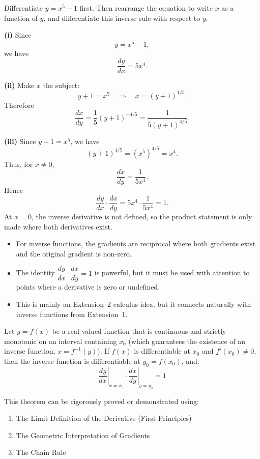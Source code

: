 \begin{hint}
Differentiate $y=x^5-1$ first. Then rearrange the equation to write $x$ as a function of $y$, and differentiate this inverse rule with respect to $y$.
\end{hint}

\begin{solution}
\textbf{(i)} Since
\[
y=x^5-1,
\]
we have
\[
\frac{dy}{dx}=5x^4.
\]

\textbf{(ii)} Make $x$ the subject:
\[
y+1=x^5
\quad\Longrightarrow\quad
x=(y+1)^{1/5}.
\]
Therefore
\[
\frac{dx}{dy}=\frac15(y+1)^{-4/5}
=\frac{1}{5(y+1)^{4/5}}.
\]

\textbf{(iii)} Since $y+1=x^5$, we have
\[
(y+1)^{4/5}=(x^5)^{4/5}=x^4.
\]
Thus, for $x\ne 0$,
\[
\frac{dx}{dy}=\frac{1}{5x^4}.
\]
Hence
\[
\frac{dy}{dx}\cdot \frac{dx}{dy}
=5x^4\cdot \frac{1}{5x^4}
=\boxed{1}.
\]
At $x=0$, the inverse derivative is not defined, so the product statement is only made where both derivatives exist.
\end{solution}

\begin{takeaways}
\begin{itemize}[leftmargin=*]
\item For inverse functions, the gradients are reciprocal where both gradients exist and the original gradient is non-zero.
\item The identity $\dfrac{dy}{dx}\cdot\dfrac{dx}{dy}=1$ is powerful, but it must be used with attention to points where a derivative is zero or undefined.
\item This is mainly an Extension~2 calculus idea, but it connects naturally with inverse functions from Extension~1.
\end{itemize}
\end{takeaways}

\begin{remark}
Let $y = f(x)$ be a real-valued function that is continuous and strictly monotonic on an interval containing $x_0$ (which guarantees the existence of an inverse function, $x = f^{-1}(y)$).
If $f(x)$ is differentiable at $x_0$ and $f'(x_0) \neq 0$, then the inverse function is differentiable at $y_0 = f(x_0)$, and:
\[ \left. \frac{dy}{dx} \right|_{x = x_0} \cdot \left. \frac{dx}{dy} \right|_{y = y_0} = 1 \]

This theorem can be rigorously proved or demonstrated using:
\begin{enumerate}
    \item The Limit Definition of the Derivative (First Principles)
    \item The Geometric Interpretation of Gradients
    \item The Chain Rule
\end{enumerate}
\end{remark}

